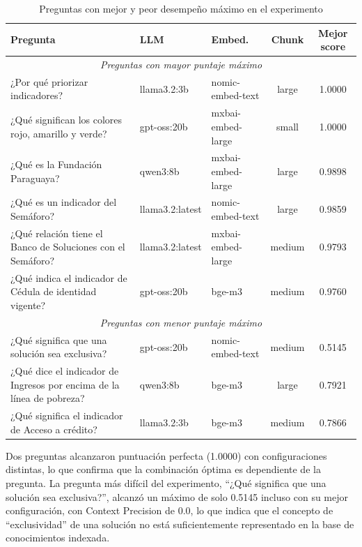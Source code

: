 \documentclass{article}
\begin{document}
\begin{table}[H]
\centering
\small
\begin{tabular}{|p{5.2cm}|l|l|c|c|}
\hline
\textbf{Pregunta} & \textbf{LLM} & \textbf{Embed.} & \textbf{Chunk} & \textbf{Mejor score} \\
\hline
\multicolumn{5}{|c|}{\textit{Preguntas con mayor puntaje máximo}} \\
\hline
¿Por qué priorizar indicadores? & llama3.2:3b & nomic-embed-text & large & 1.0000 \\
¿Qué significan los colores rojo, amarillo y verde? & gpt-oss:20b & mxbai-embed-large & small & 1.0000 \\
¿Qué es la Fundación Paraguaya? & qwen3:8b & mxbai-embed-large & large & 0.9898 \\
¿Qué es un indicador del Semáforo? & llama3.2:latest & nomic-embed-text & large & 0.9859 \\
¿Qué relación tiene el Banco de Soluciones con el Semáforo? & llama3.2:latest & mxbai-embed-large & medium & 0.9793 \\
¿Qué indica el indicador de Cédula de identidad vigente? & gpt-oss:20b & bge-m3 & medium & 0.9760 \\
\hline
\multicolumn{5}{|c|}{\textit{Preguntas con menor puntaje máximo}} \\
\hline
¿Qué significa que una solución sea exclusiva? & gpt-oss:20b & nomic-embed-text & medium & 0.5145 \\
¿Qué dice el indicador de Ingresos por encima de la línea de pobreza? & qwen3:8b & bge-m3 & large & 0.7921 \\
¿Qué significa el indicador de Acceso a crédito? & llama3.2:3b & bge-m3 & medium & 0.7866 \\
\hline
\end{tabular}
\caption{Preguntas con mejor y peor desempeño máximo en el experimento}
\label{tab:por_pregunta}
\end{table}

Dos preguntas alcanzaron puntuación perfecta (1.0000) con configuraciones
distintas, lo que confirma que la combinación óptima es dependiente de la
pregunta. La pregunta más difícil del experimento, ``¿Qué significa que una
solución sea exclusiva?'', alcanzó un máximo de solo 0.5145 incluso con su
mejor configuración, con Context Precision de 0.0, lo que indica que el concepto
de ``exclusividad'' de una solución no está suficientemente representado en la
base de conocimientos indexada.

\end{document}
